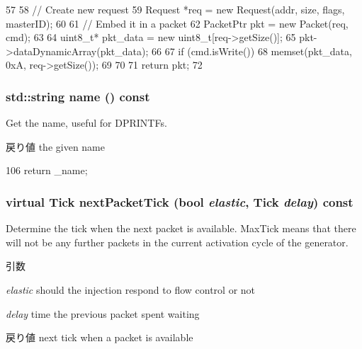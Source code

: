 \begin{DoxyCode}
57 {
58     // Create new request
59     Request *req = new Request(addr, size, flags, masterID);
60 
61     // Embed it in a packet
62     PacketPtr pkt = new Packet(req, cmd);
63 
64     uint8_t* pkt_data = new uint8_t[req->getSize()];
65     pkt->dataDynamicArray(pkt_data);
66 
67     if (cmd.isWrite()) {
68         memset(pkt_data, 0xA, req->getSize());
69     }
70 
71     return pkt;
72 }
\end{DoxyCode}
\hypertarget{classBaseGen_a37627d5d5bba7f4a8690c71c2ab3cb07}{
\subsubsection[{name}]{\setlength{\rightskip}{0pt plus 5cm}std::string name () const}}
\label{classBaseGen_a37627d5d5bba7f4a8690c71c2ab3cb07}
Get the name, useful for DPRINTFs.

\begin{DoxyReturn}{戻り値}
the given name 
\end{DoxyReturn}



\begin{DoxyCode}
106 { return _name; }
\end{DoxyCode}
\hypertarget{classBaseGen_abee7e4d35054bbc37e9332bbd17f4a69}{
\subsubsection[{nextPacketTick}]{\setlength{\rightskip}{0pt plus 5cm}virtual {\bf Tick} nextPacketTick (bool {\em elastic}, \/  {\bf Tick} {\em delay}) const}}
\label{classBaseGen_abee7e4d35054bbc37e9332bbd17f4a69}
Determine the tick when the next packet is available. MaxTick means that there will not be any further packets in the current activation cycle of the generator.


\begin{DoxyParams}{引数}
\item[{\em elastic}]should the injection respond to flow control or not \item[{\em delay}]time the previous packet spent waiting \end{DoxyParams}
\begin{DoxyReturn}{戻り値}
next tick when a packet is available 
\end{DoxyReturn}


